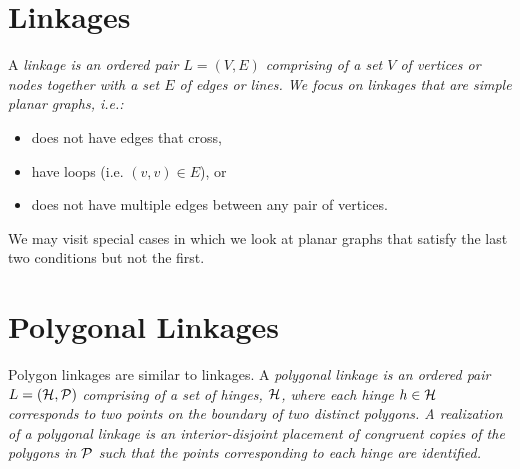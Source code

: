 \section{Linkages}
A \it{linkage} is an ordered pair $L = (V,E)$ comprising of a set $V$ of vertices or nodes together with a set $E$ of edges or lines. %
We focus on linkages that are simple planar  graphs, i.e.:
\begin{itemize}
\item[\rn{1}] does not have edges that cross,
\item[\rn{2}] have loops (i.e. $(v,v) \in E$), or
\item[\rn{3}] does not have multiple edges between any pair of vertices.
\end{itemize}
We may visit special cases in which we look at planar graphs that satisfy the last two conditions but not the first.  
\section{Polygonal Linkages}
Polygon linkages are similar to linkages.  A \it{polygonal linkage} is an ordered pair $L = ({\cal H},{\cal P})$ comprising of a set of hinges, ${\cal H}$, where each hinge $h\in {\cal H}$ corresponds to two points on the boundary of two distinct polygons.  
A \emph{realization} of a polygonal linkage is an interior-disjoint placement of congruent copies of the polygons in ${\cal P}$ such that the points corresponding to each hinge are identified.  
